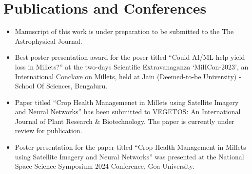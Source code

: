 \section{Publications and Conferences}

\begin{itemize}

        \item Manuscript of this work is under preparation to be submitted to the The Astrophysical Journal.

        \item Best poster presentation award for the poser titled ``Could AI/ML help yield loss in Millets?'' at the two-days Scientific Extravanaganza `MilICon-2023', an International Conclave on Millets, held at Jain (Deemed-to-be University) - School Of Sciences, Bengaluru.

        \item Paper titled ``Crop Health Managemenet in Millets using Satellite Imagery and Neural Networks'' has been submitted to VEGETOS: An International Journal of Plant Research & Biotechnology. The paper is currently under review for publication.

        \item Poster presentation for the paper titled ``Crop Health Management in Millets using Satellite Imagery and Neural Networks'' was presented at the National Space Science Symposium 2024 Conference, Goa University.

\end{itemize}

